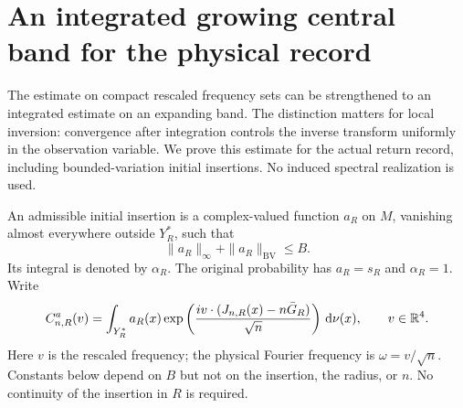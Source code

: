 \section{An integrated growing central band for the physical record}
\label{sec:growing-major-arc}
The estimate on compact rescaled frequency sets can be strengthened to
an integrated estimate on an expanding band. The distinction matters
for local inversion: convergence after integration controls the inverse
transform uniformly in the observation variable. We prove this estimate
for the actual return record, including bounded-variation initial
insertions. No induced spectral realization is used.

An admissible initial insertion is a complex-valued function $a_R$ on
$M$, vanishing almost everywhere outside $Y_R^*$, such that
\[
 \|a_R\|_\infty+\|a_R\|_{\mathrm{BV}}\le B.
\]
Its integral is denoted by $\alpha_R$. The original probability has
$a_R=s_R$ and $\alpha_R=1$. Write
\begin{equation}\label{eq:inserted-central-characteristic}
 C^a_{n,R}(v)=\int_{Y_R^*}a_R(x)
 \exp\left(\frac{i v\cdot(J_{n,R}(x)-n\bar G_R)}{\sqrt n}\right)
 \,\mathrm d\nu(x),\qquad v\in\mathbb R^4.
\end{equation}
Here $v$ is the rescaled frequency; the physical Fourier frequency is
$\omega=v/\sqrt n$. Constants below depend on $B$ but not on the
insertion, the radius, or $n$. No continuity of the insertion in $R$
is required.

